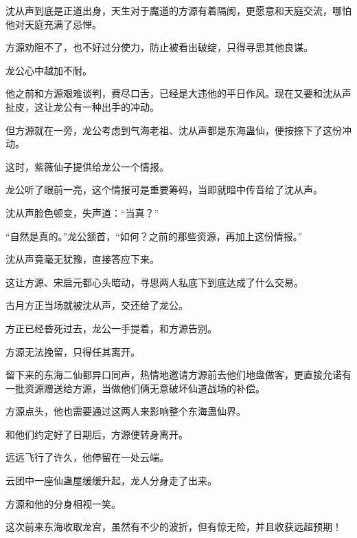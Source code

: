 \begin{this_body}
沈从声到底是正道出身，天生对于魔道的方源有着隔阂，更愿意和天庭交流，哪怕他对天庭充满了忌惮。

方源劝阻不了，也不好过分使力，防止被看出破绽，只得寻思其他良谋。

龙公心中越加不耐。

他之前和方源艰难谈判，费尽口舌，已经是大违他的平日作风。现在又要和沈从声扯皮，这让龙公有一种出手的冲动。

但方源就在一旁，龙公考虑到气海老祖、沈从声都是东海蛊仙，便按捺下了这份冲动。

这时，紫薇仙子提供给龙公一个情报。

龙公听了眼前一亮，这个情报可是重要筹码，当即就暗中传音给了沈从声。

沈从声脸色顿变，失声道：“当真？”

“自然是真的。”龙公颔首，“如何？之前的那些资源，再加上这份情报。”

沈从声竟毫无犹豫，直接答应下来。

这让方源、宋启元都心头暗动，寻思两人私底下到底达成了什么交易。

古月方正当场就被沈从声，交还给了龙公。

方正已经昏死过去，龙公一手提着，和方源告别。

方源无法挽留，只得任其离开。

留下来的东海二仙都异口同声，热情地邀请方源前去他们地盘做客，更直接允诺有一批资源赠送给方源，当做他们俩无意破坏仙道战场的补偿。

方源点头，他也需要通过这两人来影响整个东海蛊仙界。

和他们约定好了日期后，方源便转身离开。

远远飞行了许久，他停留在一处云端。

云团中一座仙蛊屋缓缓升起，龙人分身走了出来。

方源和他的分身相视一笑。

这次前来东海收取龙宫，虽然有不少的波折，但有惊无险，并且收获远超预期！

\end{this_body}

